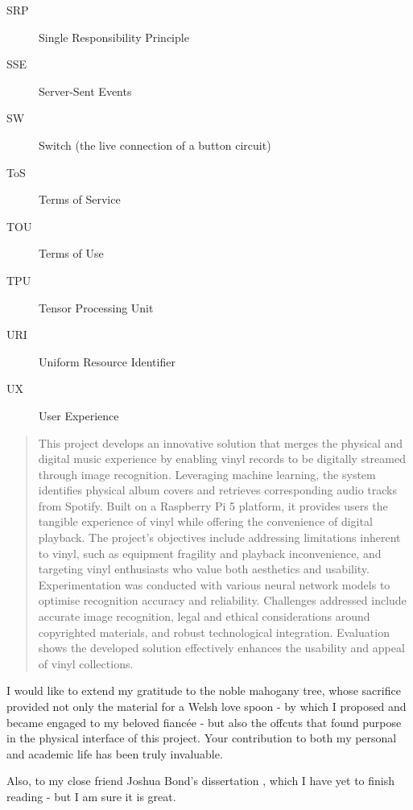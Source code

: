 \begin{description}
        \item[SRP] Single Responsibility Principle
        \item[SSE] Server-Sent Events
        \item[SW] Switch (the live connection of a button circuit) 
        \item[ToS] Terms of Service
        \item[TOU] Terms of Use
        \item[TPU] Tensor Processing Unit 
        \item[URI] Uniform Resource Identifier
        \item[UX] User Experience
      \end{description}
    
    \begin{abstract} %
    
        This project develops an innovative solution that merges the physical and digital music experience by enabling vinyl records to be digitally streamed through image recognition. Leveraging machine learning, the system identifies physical album covers and retrieves corresponding audio tracks from Spotify. Built on a Raspberry Pi 5 platform, it provides users the tangible experience of vinyl while offering the convenience of digital playback. The project's objectives include addressing limitations inherent to vinyl, such as equipment fragility and playback inconvenience, and targeting vinyl enthusiasts who value both aesthetics and usability. Experimentation was conducted with various neural network models to optimise recognition accuracy and reliability. Challenges addressed include accurate image recognition, legal and ethical considerations around copyrighted materials, and robust technological integration. Evaluation shows the developed solution effectively enhances the usability and appeal of vinyl collections.
    
    \end{abstract}%
    \clearpage
    
    
    
    \uomdeclarations %
    
    
    
    \begin{uomacknowledgements}
    I would like to extend my gratitude to the noble mahogany tree, whose sacrifice provided not only the material for a Welsh love spoon - by which I proposed and became engaged to my beloved fiancée - but also the offcuts that found purpose in the physical interface of this project. Your contribution to both my personal and academic life has been truly invaluable.
    
    Also, to my close friend Joshua Bond’s dissertation \cite{jdbond}, which I have yet to finish reading - but I am sure it is great.
    \end{uomacknowledgements}
    
